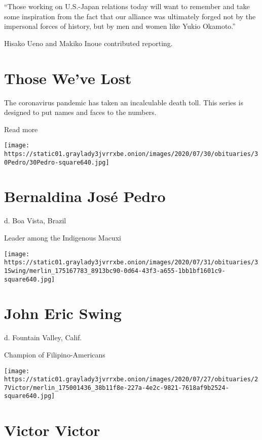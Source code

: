 ``Those working on U.S.-Japan relations today will want to remember and
take some inspiration from the fact that our alliance was ultimately
forged not by the impersonal forces of history, but by men and women
like Yukio Okamoto.''

Hisako Ueno and Makiko Inoue contributed reporting.

\href{https://www.nytimes3xbfgragh.onion/interactive/2020/obituaries/people-died-coronavirus-obituaries.html?action=click\&pgtype=Article\&state=default\&region=BELOW_MAIN_CONTENT\&context=covid_obits_promo}{}

\hypertarget{those-weve-lost}{%
\section{Those We've Lost}\label{those-weve-lost}}

The coronavirus pandemic has taken an incalculable death toll. This
series is designed to put names and faces to the numbers.

Read more

\texttt{[image: https://static01.graylady3jvrrxbe.onion/images/2020/07/30/obituaries/30Pedro/30Pedro-square640.jpg]}

\hypertarget{bernaldina-josuxe9-pedro}{%
\section{Bernaldina José Pedro}\label{bernaldina-josuxe9-pedro}}

d. Boa Vista, Brazil

Leader among the Indigenous Macuxi

\texttt{[image: https://static01.graylady3jvrrxbe.onion/images/2020/07/31/obituaries/31Swing/merlin\_175167783\_8913bc90-0d64-43f3-a655-1bb1bf1601c9-square640.jpg]}

\hypertarget{john-eric-swing}{%
\section{John Eric Swing}\label{john-eric-swing}}

d. Fountain Valley, Calif.

Champion of Filipino-Americans

\texttt{[image: https://static01.graylady3jvrrxbe.onion/images/2020/07/27/obituaries/27Victor/merlin\_175001436\_38b11f8e-227a-4e2c-9821-7618af9b2524-square640.jpg]}

\hypertarget{victor-victor}{%
\section{Victor Victor}\label{victor-victor}}

